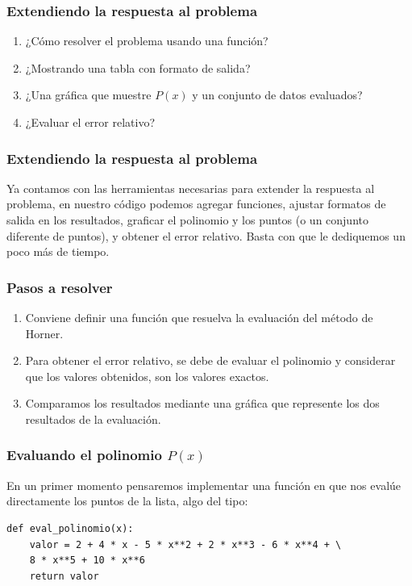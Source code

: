 \documentclass[12pt]{beamer}
\begin{document}
\begin{frame}
\frametitle{Extendiendo la respuesta al problema}
\begin{enumerate}[<+->]
\item ¿Cómo resolver el problema usando una función? 
\item ¿Mostrando una tabla con formato de salida?
\item ¿Una gráfica que muestre $P (x)$ y un conjunto de datos evaluados?
\item ¿Evaluar el error relativo?
\end{enumerate}
\end{frame}
\begin{frame}
\frametitle{Extendiendo la respuesta al problema}
Ya contamos con las herramientas necesarias para extender la respuesta al problema, en nuestro código podemos agregar funciones, ajustar formatos de salida en los resultados, graficar el polinomio y los puntos (o un conjunto diferente de puntos), y obtener el error relativo. Basta con que le dediquemos un poco más de tiempo.
\end{frame}
\begin{frame}
\frametitle{Pasos a resolver}
\begin{enumerate}[<+->]
\item Conviene definir una función que resuelva la evaluación del método de Horner.
\item Para obtener el error relativo, se debe de evaluar el polinomio y considerar que los valores obtenidos, son los valores exactos.
\item Comparamos los resultados mediante una gráfica que represente los dos resultados de la evaluación.
\end{enumerate}
\end{frame}
\begin{frame}[fragile]
\frametitle{Evaluando el polinomio $P (x)$}
En un primer momento pensaremos implementar una función en \python{} que nos evalúe directamente los puntos de la lista, algo del tipo:
\pause
\begin{lstlisting}[caption=Evluación directa del polinomio]
def eval_polinomio(x):
    valor = 2 + 4 * x - 5 * x**2 + 2 * x**3 - 6 * x**4 + \
    8 * x**5 + 10 * x**6
    return valor
\end{lstlisting}
\end{frame}
\end{document}
